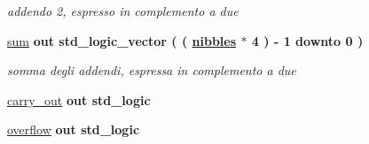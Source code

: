 \begin{DoxyCompactItemize}
\begin{DoxyCompactList}\small\item\em addendo 2, espresso in complemento a due \end{DoxyCompactList}\item 
\hyperlink{group___carry_loockahead_ga1b4798a9e96bb32e9c08ce68e24e7871}{sum}  {\bfseries {\bfseries \textcolor{vhdlchar}{out}\textcolor{vhdlchar}{ }}} {\bfseries \textcolor{vhdlchar}{std\+\_\+logic\+\_\+vector}\textcolor{vhdlchar}{ }\textcolor{vhdlchar}{(}\textcolor{vhdlchar}{ }\textcolor{vhdlchar}{(}\textcolor{vhdlchar}{ }\textcolor{vhdlchar}{ }\textcolor{vhdlchar}{ }\textcolor{vhdlchar}{ }{\bfseries \hyperlink{group___carry_loockahead_ga0b63b586531492d0fa882246cca071c1}{nibbles}} \textcolor{vhdlchar}{$\ast$}\textcolor{vhdlchar}{ } \textcolor{vhdldigit}{4} \textcolor{vhdlchar}{ }\textcolor{vhdlchar}{)}\textcolor{vhdlchar}{ }\textcolor{vhdlchar}{-\/}\textcolor{vhdlchar}{ } \textcolor{vhdldigit}{1} \textcolor{vhdlchar}{ }\textcolor{vhdlchar}{downto}\textcolor{vhdlchar}{ }\textcolor{vhdlchar}{ } \textcolor{vhdldigit}{0} \textcolor{vhdlchar}{ }\textcolor{vhdlchar}{)}\textcolor{vhdlchar}{ }} 
\begin{DoxyCompactList}\small\item\em somma degli addendi, espressa in complemento a due \end{DoxyCompactList}\item 
\hyperlink{group___carry_loockahead_ga851aaea297bdc862fba5478c4bf0e214}{carry\+\_\+out}  {\bfseries {\bfseries \textcolor{vhdlchar}{out}\textcolor{vhdlchar}{ }}} {\bfseries \textcolor{vhdlchar}{std\+\_\+logic}\textcolor{vhdlchar}{ }} 
\item 
\hyperlink{group___carry_loockahead_ga9650307dde287e0bcfa1e26370c006c2}{overflow}  {\bfseries {\bfseries \textcolor{vhdlchar}{out}\textcolor{vhdlchar}{ }}} {\bfseries \textcolor{vhdlchar}{std\+\_\+logic}\textcolor{vhdlchar}{ }} 
\end{DoxyCompactItemize}
